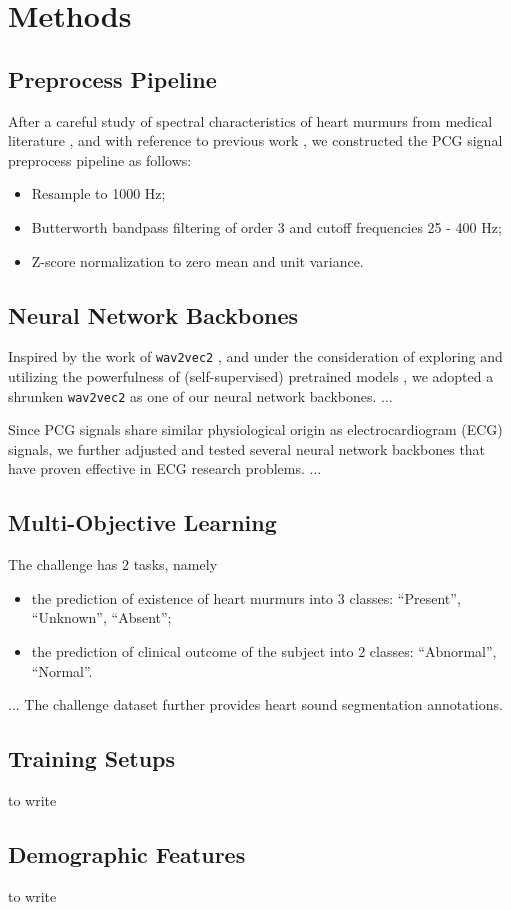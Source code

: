 \section{Methods}
\label{sec:methods}

\subsection{Preprocess Pipeline}
\label{subsec:preproc}

After a careful study of spectral characteristics of heart murmurs from medical literature \cite{Donnerstein_1989, Noponen_2007}, and with reference to previous work \cite{Schmidt_2010}, we constructed the PCG signal preprocess pipeline as follows:
\begin{itemize}
    \item Resample to 1000 Hz;
    \item Butterworth bandpass filtering of order 3 and cutoff frequencies 25 - 400 Hz;
    \item Z-score normalization to zero mean and unit variance.
\end{itemize}

\subsection{Neural Network Backbones}
\label{subsec:nn}

Inspired by the work of \texttt{wav2vec2} \cite{baevski2020wav2vec}, and under the consideration of exploring and utilizing the powerfulness of (self-supervised) pretrained models \cite{wolf-etal-2020-transformers}, we adopted a shrunken \texttt{wav2vec2} as one of our neural network backbones. ...

Since PCG signals share similar physiological origin as electrocardiogram (ECG) signals, we further adjusted and tested several neural network backbones \cite{Kang_2022_cinc2021_iop} that have proven effective in ECG research problems. ...

\subsection{Multi-Objective Learning}
\label{subsec:mol}

The challenge has 2 tasks, namely 
\begin{itemize}
    \item the prediction of existence of heart murmurs into 3 classes: ``Present'', ``Unknown'', ``Absent'';
    \item the prediction of clinical outcome of the subject into 2 classes: ``Abnormal'', ``Normal''.
\end{itemize}

... The challenge dataset \cite{Oliveira_2021_CirCor} further provides heart sound segmentation annotations.

\cite{Caruana_1997_mtl}

\subsection{Training Setups}
\label{subsec:training}

to write


\subsection{Demographic Features}
\label{subsec:demo_feat}

to write
